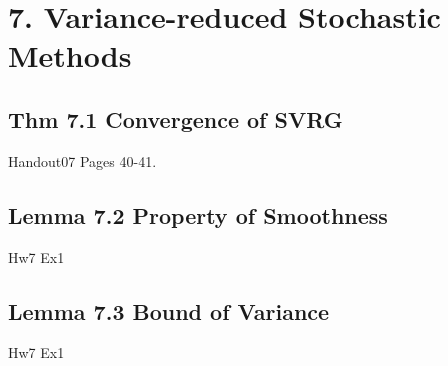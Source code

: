 \section*{7. Variance-reduced Stochastic Methods}
\subsection*{Thm 7.1 Convergence of SVRG}
Handout07 Pages 40-41.

\subsection*{Lemma 7.2 Property of Smoothness}
Hw7 Ex1
\subsection*{Lemma 7.3 Bound of Variance}
Hw7 Ex1
